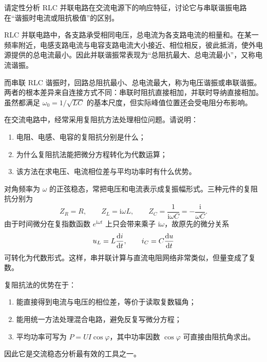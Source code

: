 \begin{problem}
请定性分析 RLC 并联电路在交流电源下的响应特征，讨论它与串联谐振电路在“谐振时电流或阻抗极值”的区别。

\begin{solution}
RLC 并联电路中，各支路承受相同电压，总电流为各支路电流的相量和。在某一频率附近，电感支路电流与电容支路电流大小接近、相位相反，彼此抵消，使外电源提供的总电流最小。因此并联谐振常表现为“总阻抗最大、总电流最小”，又称电流谐振。

而串联 RLC 谐振时，回路总阻抗最小、总电流最大，称为电压谐振或串联谐振。两者的根本差异来自连接方式不同：串联时阻抗直接相加，并联时导纳直接相加。虽然都满足 $\omega_0=1/\sqrt{LC}$ 的基本尺度，但实际峰值位置还会受电阻分布影响。
\end{solution}
\end{problem}

\begin{problem}
在交流电路中，经常采用复阻抗方法处理相位问题。请说明：
\begin{enumerate}
  \item 电阻、电感、电容的复阻抗分别是什么；
  \item 为什么复阻抗法能把微分方程转化为代数运算；
  \item 该方法在求电压、电流相位差与平均功率时有什么优势。
\end{enumerate}

\begin{solution}
对角频率为 $\omega$ 的正弦稳态，常把电压和电流表示成复振幅形式。三种元件的复阻抗分别为
\[
Z_R=R,\qquad Z_L=\mathrm{i}\omega L,\qquad Z_C=\frac{1}{\mathrm{i}\omega C}=-\frac{\mathrm{i}}{\omega C}.
\]
由于时间微分在复指数函数 $e^{\mathrm{i}\omega t}$ 上只会带来乘子 $\mathrm{i}\omega$，故原先的微分关系
\[
u_L=L\dv{i}{t},\qquad i_C=C\dv{u}{t}
\]
可转化为代数形式。这样，串并联计算与直流电阻网络非常类似，但量变成了复数。

复阻抗法的优势在于：
\begin{enumerate}
  \item 能直接得到电流与电压的相位差，等价于读取复数辐角；
  \item 能用统一方法处理混合电路，避免反复写微分方程；
  \item 平均功率可写为 $P=UI\cos\varphi$，其中功率因数 $\cos\varphi$ 可直接由阻抗角求出。
\end{enumerate}
因此它是交流稳态分析最有效的工具之一。
\end{solution}
\end{problem}
